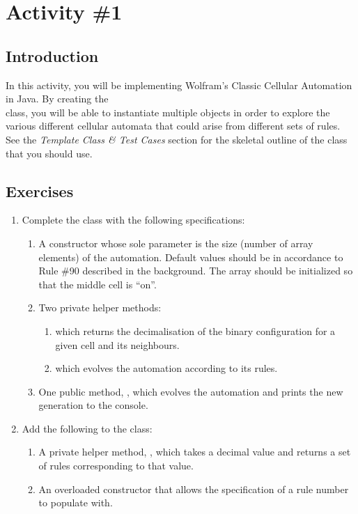 
  \pagebreak

	\section{Activity \#1}
		\subsection{Introduction}
	  In this activity, you will be implementing Wolfram's Classic Cellular Automation in Java. By creating the\\  class, you will be able to instantiate multiple  objects in order to explore the various different cellular automata that could arise from different sets of rules. See the \emph{Template Class \& Test Cases} section for the skeletal outline of the  class that you should use.

	  \subsection{Exercises}
	    \begin{enumerate}
	      \item Complete the  class with the following specifications:
	        \begin{enumerate}
	          \item A constructor whose sole parameter is the size (number of array elements) of the automation. Default  values should be in accordance to Rule \#90 described in the background. The  array should be initialized so that the middle cell is ``on''.
	          \item Two private helper methods:
	          \begin{enumerate}
	            \item {} which returns the decimalisation of the binary configuration for a given cell and its neighbours.
	            \item {} which evolves the automation according to its rules.
	          \end{enumerate}
	          \item One public method, , which evolves the automation and prints the new generation to the console.
	        \end{enumerate}

	      \item Add the following to the  class:
	        \begin{enumerate}
	          \item A private helper method, , which takes a decimal  value and returns a set of rules corresponding to that value.
	          \item An overloaded constructor that allows the specification of a rule number to populate  with.
	        \end{enumerate}
	    \end{enumerate}

